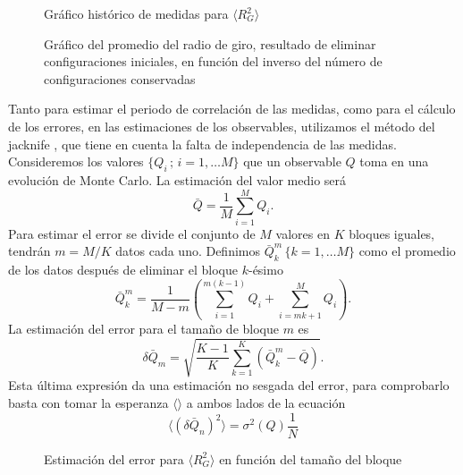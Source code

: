 \begin{figure}[h]
\centering
 \resizebox{\columnwidth}{!}{}\label{grafico_historico}
\caption{Gráfico histórico de medidas para $\langle R_G^2\rangle$}\label{grafico_historico}
\end{figure}    

\begin{figure}[h]
\centering
 \resizebox{\columnwidth}{!}{}\label{grafico_logtermal}
\caption{Gráfico del promedio del radio de giro, resultado de eliminar
  configuraciones iniciales, en función del inverso del número de configuraciones conservadas}
\end{figure}

Tanto para estimar el periodo de correlación de las medidas, como para el
cálculo de los errores, en las estimaciones de los observables, 
utilizamos el método del jacknife \cite{Juan:tesis}, que tiene en cuenta la
falta de independencia de las medidas. Consideremos los valores
$\{Q_i\,;\, i=1,\dots M\}$ que un observable $Q$ toma en una evolución de Monte
Carlo. La estimación del valor medio será
\begin{equation}
\bar{Q}=\frac{1}{M}\sum^M_{i=1}Q_i.
\end{equation}
Para estimar el error se divide el conjunto de $M$ valores en $K$ bloques
iguales, tendrán $m=M/K$ datos cada uno. Definimos $\bar{Q}^m_k \, \{k=1,\dots
M\}$ como el promedio de los datos después de eliminar el bloque $k$-ésimo
\begin{equation}
\bar{Q}_k^m=\frac{1}{M-m}\left(\sum^{m(k-1)}_{i=1}Q_i+\sum^{M}_{i=mk+1}Q_i\right).
\end{equation}
La estimación del error para el tamaño de bloque $m$ es
\begin{equation}
\delta\bar{Q}_m=\sqrt{\frac{K-1}{K}\sum^K_{k=1}(\bar{Q}^m_k-\bar{Q})}.
\end{equation}
Esta última expresión da una estimación no sesgada del error, para comprobarlo
basta con tomar la esperanza $\langle \rangle$ a ambos lados de la ecuación
\begin{equation}
\langle (\delta\bar{Q}_n)^2\rangle=\sigma^2(Q)\frac{1}{N} 
\end{equation}

\begin{figure}[h]
\centering
 \resizebox{\columnwidth}{!}{}
\caption{Estimación del error para $\langle R_G^2\rangle$ en función del tamaño del bloque}\label{figura_ejemplo_error}
\end{figure} 

